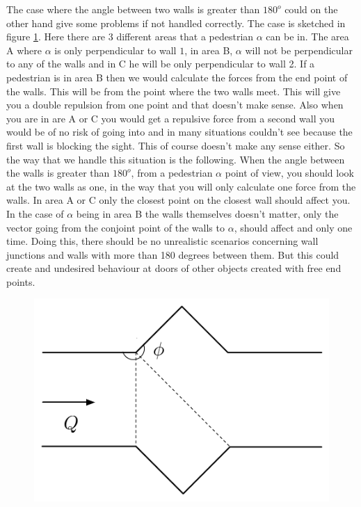 The case where the angle between two walls is greater than $180^o$ could on the 
other hand give some problems if not handled correctly. The case is sketched in 
figure \ref{fig:wallcase}. Here there are 3 different areas that a pedestrian $\alpha$ 
can be in. The area A where $\alpha$ is only perpendicular to wall $1$, in area B, 
$\alpha$ will not be perpendicular to any of the walls and in C he will be only 
perpendicular to wall 2. If a pedestrian is in area B then we would calculate the 
forces from the end point of the walls. This will be from the point where the two 
walls meet. This will give you a double repulsion from one point and that 
doesn't make sense. Also when you are in are A or C you would get a repulsive force 
from a second wall you would be of no risk of going into and in many situations 
couldn't see because the first wall is blocking the sight. This of course doesn't 
make any sense either. So the way that we handle this situation is the following. 
When the angle between the walls is greater than $180^o$, from a pedestrian $\alpha$ 
point of view, you should look at the two walls as one, in the way that you will 
only calculate one force from the walls. In area A or C only the closest point 
on the closest wall should affect you. In the case of $\alpha$ being in area B 
the walls themselves doesn't matter, only the vector going from the conjoint 
point of the walls to $\alpha$, should affect and only one time. Doing this, 
there should be no unrealistic scenarios concerning wall junctions and walls 
with more than 180 degrees between them. But this could create and undesired 
behaviour at doors of other objects created with free end points.

\begin{figure}[ht]
\centering
\includegraphics[scale=0.45]{Figures/WallCase.pdf} 
\caption{}\label{fig:wallcase}
\end{figure}

